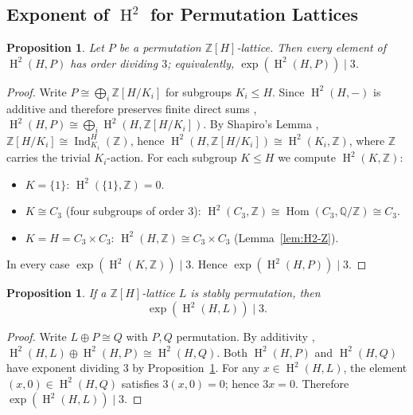\documentclass[12pt,a4paper]{article}
\newtheorem{proposition}[theorem]{Proposition}
\theoremstyle{definition}
\DeclareMathOperator{\Hom}{Hom}
\DeclareMathOperator{\Ind}{Ind}
\DeclareMathOperator{\coh}{H}
\begin{document}
\subsection{Exponent of \(\coh^2\) for Permutation Lattices}

\begin{proposition}\label{prop:perm-exponent}
Let \(P\) be a permutation \(\mathbb{Z}[H]\)-lattice.  Then every element of
\(\coh^2(H, P)\) has order dividing \(3\); equivalently,
\(\exp(\coh^2(H, P)) \mid 3\).
\end{proposition}

\begin{proof}
Write \(P \cong \bigoplus_{i} \mathbb{Z}[H/K_i]\) for subgroups \(K_i \le H\).
Since \(\coh^2(H, {-})\) is additive and therefore preserves finite
direct sums \cite[Proposition~3.3.4]{Weibel1994},
\(\coh^2(H, P) \cong \bigoplus_i \coh^2(H, \mathbb{Z}[H/K_i])\).
By Shapiro's Lemma \cite[Theorem~6.3.2]{Weibel1994},
\(\mathbb{Z}[H/K_i] \cong \Ind_{K_i}^H(\mathbb{Z})\),
hence \(\coh^2(H, \mathbb{Z}[H/K_i]) \cong \coh^2(K_i, \mathbb{Z})\),
where \(\mathbb{Z}\) carries the trivial \(K_i\)-action.
For each subgroup \(K \le H\) we compute \(\coh^2(K, \mathbb{Z})\):
\begin{itemize}
  \item \(K = \{1\}\):
    \(\coh^2(\{1\}, \mathbb{Z}) = 0\).
  \item \(K \cong C_3\) (four subgroups of order \(3\)):
\(\coh^2(C_3, \mathbb{Z}) \cong \Hom(C_3, \mathbb{Q}/\mathbb{Z}) \cong C_3\).
  \item \(K = H = C_3 \times C_3\):
    \(\coh^2(H, \mathbb{Z}) \cong C_3 \times C_3\) (Lemma~\ref{lem:H2-Z}).
\end{itemize}
In every case \(\exp(\coh^2(K, \mathbb{Z})) \mid 3\).  Hence
\(\exp(\coh^2(H, P)) \mid 3\).
\end{proof}

\begin{proposition}\label{prop:stable-exp}
If a \(\mathbb{Z}[H]\)-lattice \(L\) is stably permutation, then
\[ \exp(\coh^2(H, L)) \mid 3. \]
\end{proposition}
\begin{proof}
Write \(L \oplus P \cong Q\) with \(P, Q\) permutation.  By additivity
\cite[Proposition~3.3.4]{Weibel1994},
\(\coh^2(H, L) \oplus \coh^2(H, P) \cong \coh^2(H, Q)\).  Both
\(\coh^2(H, P)\) and \(\coh^2(H, Q)\) have exponent dividing \(3\) by
Proposition~\ref{prop:perm-exponent}.  For any \(x \in \coh^2(H, L)\),
the element \((x,0) \in \coh^2(H, Q)\) satisfies \(3(x,0) = 0\); hence
\(3x = 0\).  Therefore \(\exp(\coh^2(H, L)) \mid 3\).
\end{proof}
\end{document}
